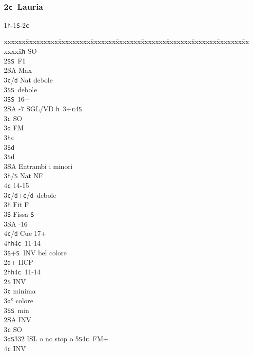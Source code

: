 \documentclass[a4paper,italian]{article}
\newcommand{\BS}{\small{\texttt{S}}}
\newcommand{\BC}{\small{\texttt{c}}}
\newcommand{\BD}{\small{\texttt{d}}}
\newcommand{\BH}{\small{\texttt{h}}}
\newcommand{\pdfc}{\texorpdfstring{\texttt{c}}{C}}
\newenvironment{bidtable}
{\begin{tabbing}

    xxxxxx\=xxxxxxxxx\=xxxxxxxxx\=xxxxxxx\=xxxxxxx\=xxxxxxx\=xxxxxxx\=xxxxxxx\=xxxxxxx\=xxxxxxx\=\kill}
{\end{tabbing} }%
\begin{document}
\begin{multicols*}{2}
    \subsubsection{2\pdfc\ Lauria} \label{lauria}

    1\BH-1\BS-2\BC
    \begin{bidtable}
        2\BH \> SO\+\\
        2\BS {}\BS\ F1\+\\
        2\small{SA} \> Max\\
        3\BC/\BD \> Nat debole\\
        3\BS {}\BS\ debole\-\\
        3\BS {}\BS\ 16+\-\\
        2\small{SA} -7 SGL/VD \BH\ 3+\BC 4\BS \+\\
        3\BC \> SO\\
        3\BD \> FM\+\\
        3\BH {}\BC \+\\
        3\BS {}\BD \-\\
        3\BS {}\BD \\
        3\small{SA} \> Entrambi i minori\-\\
        3\BH/\BS \> Nat NF\\
        4\BC {} 14-15\-\\
        3\BC/\BD {}+\BC /\BD\ debole\\
        3\BH \> Fit F\+\\
        3\BS \> Fissa \BS\\
        3\small{SA} -16\\
        4\BC/\BD \> Cue 17+\\
        4\BH {}\BH 4\BC\ 11-14\-\\
        3\BS {}+\BS\ INV bel colore\\
        2\BD {}+ HCP\+\\
        2\BH {}\BH 4\BC\ 11-14\+\\
        2\BS \> INV\+\\
        3\BC {} minima\\
        3\BD {}° colore\\
        3\BS {}\BS\ min\-\\
        2\small{SA} \> INV\\
        3\BC \> SO\\
        3\BD {}\BS 332 ISL o no stop o 5\BS 4\BC\ FM+\\
        4\BC \> INV\-\\

\end{bidtable}
\end{multicols*}
\end{document}
